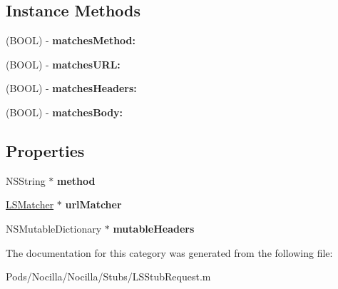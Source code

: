 \subsection*{Instance Methods}
\begin{DoxyCompactItemize}
\item 
\hypertarget{category_l_s_stub_request_07_08_a524a792cb3a76dcf7149ce37c939dd83}{(B\-O\-O\-L) -\/ {\bfseries matches\-Method\-:}}\label{category_l_s_stub_request_07_08_a524a792cb3a76dcf7149ce37c939dd83}

\item 
\hypertarget{category_l_s_stub_request_07_08_a491b486644cef344ae1886706a9be193}{(B\-O\-O\-L) -\/ {\bfseries matches\-U\-R\-L\-:}}\label{category_l_s_stub_request_07_08_a491b486644cef344ae1886706a9be193}

\item 
\hypertarget{category_l_s_stub_request_07_08_a3c550b26f80a63be4411b81fcc8afb8d}{(B\-O\-O\-L) -\/ {\bfseries matches\-Headers\-:}}\label{category_l_s_stub_request_07_08_a3c550b26f80a63be4411b81fcc8afb8d}

\item 
\hypertarget{category_l_s_stub_request_07_08_aa16fc300653ba041530c1db9080cee33}{(B\-O\-O\-L) -\/ {\bfseries matches\-Body\-:}}\label{category_l_s_stub_request_07_08_aa16fc300653ba041530c1db9080cee33}

\end{DoxyCompactItemize}
\subsection*{Properties}
\begin{DoxyCompactItemize}
\item 
\hypertarget{category_l_s_stub_request_07_08_a564e15b5975add49e4b353cb626a92a9}{N\-S\-String $\ast$ {\bfseries method}}\label{category_l_s_stub_request_07_08_a564e15b5975add49e4b353cb626a92a9}

\item 
\hypertarget{category_l_s_stub_request_07_08_ad4a5a261af8c996959c4627265dd234c}{\hyperlink{interface_l_s_matcher}{L\-S\-Matcher} $\ast$ {\bfseries url\-Matcher}}\label{category_l_s_stub_request_07_08_ad4a5a261af8c996959c4627265dd234c}

\item 
\hypertarget{category_l_s_stub_request_07_08_a66c9d44c07566a43ef85bbdef8a28d15}{N\-S\-Mutable\-Dictionary $\ast$ {\bfseries mutable\-Headers}}\label{category_l_s_stub_request_07_08_a66c9d44c07566a43ef85bbdef8a28d15}

\end{DoxyCompactItemize}


The documentation for this category was generated from the following file\-:\begin{DoxyCompactItemize}
\item 
Pods/\-Nocilla/\-Nocilla/\-Stubs/L\-S\-Stub\-Request.\-m\end{DoxyCompactItemize}
